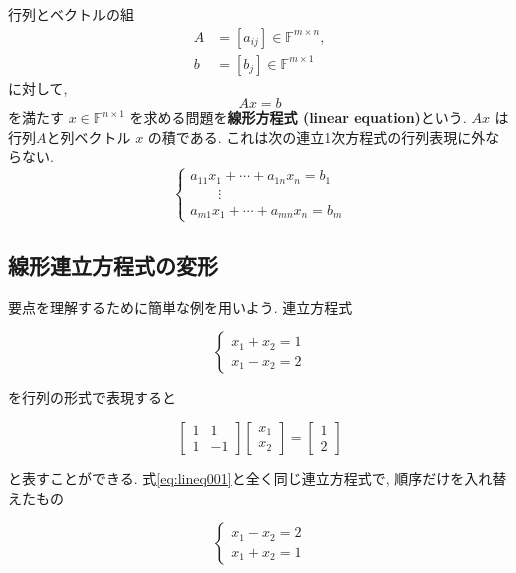 \documentclass[a4paper]{scrbook}
\theoremstyle{definition}
\begin{document}
行列とベクトルの組 \[
\begin{aligned}
  A & =[a_{ij}]\in\mathbb{F}^{m\times n},\\
  b & =[b_{j}]\in\mathbb{F}^{m\times1}
\end{aligned}
\] に対して, \[
Ax=b
\] を満たす \(x\in\mathbb{F}^{n\times1}\)
を求める問題を\textbf{線形方程式 (linear equation)}という. \(Ax\)
は行列\(A\)と列ベクトル \(x\) の積である.
これは次の連立1次方程式の行列表現に外ならない. \[
\begin{cases}
a_{11}x_{1}+\cdots+a_{1n}x_{n}=b_{1}\\
\qquad\vdots\\
a_{m1}x_{1}+\cdots+a_{mn}x_{n}=b_{m}
\end{cases}
\]

\subsection{線形連立方程式の変形}

要点を理解するために簡単な例を用いよう. 連立方程式

\begin{equation}
  \begin{cases}
    x_{1}+x_{2}=1\\
    x_{1}-x_{2}=2
  \end{cases} \label{eq:lineq001}
\end{equation}

を行列の形式で表現すると

\begin{equation}
  \begin{bmatrix}
    1 & 1\\
    1 & -1
  \end{bmatrix}
  \begin{bmatrix}
    x_{1}\\x_{2}
  \end{bmatrix}
  =
  \begin{bmatrix}
    1\\2
  \end{bmatrix} \label{eq:lineq002}
\end{equation}

と表すことができる. 式\eqref{eq:lineq001}と全く同じ連立方程式で,
順序だけを入れ替えたもの

\begin{equation}
\begin{cases}
x_{1}-x_{2}=2\\
x_{1}+x_{2}=1 
\end{cases} \label{eq:lineq003}
\end{equation}
\end{document}
